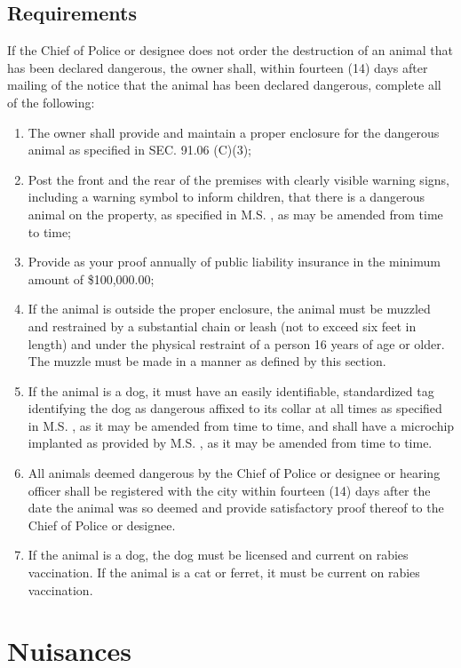 \subsection{Requirements}
If the Chief of Police or designee does not order the destruction of an animal that has been declared dangerous, the owner shall, within fourteen (14) days after mailing of the notice that the animal has been declared dangerous, complete all of the following:
\begin{enumerate}[{\indent}1)]
    \item The owner shall provide and maintain a proper enclosure for the dangerous animal as specified in SEC. 91.06 (C)(3);
    \item Post the front and the rear of the premises with clearly visible warning signs, including a warning symbol to inform children, that there is a dangerous animal on the property, as specified in M.S. , as may be amended from time to time;
    \item Provide as your proof annually of public liability insurance in the minimum amount of \$100,000.00;
    \item If the animal is outside the proper enclosure, the animal must be muzzled and restrained by a substantial chain or leash (not to exceed six feet in length) and under the physical restraint of a person 16 years of age or older.  The muzzle must be made in a manner as defined by this section.
    \item If the animal is a dog, it must have an easily identifiable, standardized tag identifying the dog as dangerous affixed to its collar at all times as specified in M.S. , as it may be amended from time to time, and shall have a microchip implanted as provided by M.S. , as it may be amended from time to time.
    \item All animals deemed dangerous by the Chief of Police or designee or hearing officer shall be registered with the city within fourteen (14) days after the date the animal was so deemed and provide satisfactory proof thereof to the Chief of Police or designee.
    \item If the animal is a dog, the dog must be licensed and current on rabies vaccination.  If the animal is a cat or ferret, it must be current on rabies vaccination.
\end{enumerate}
\section{Nuisances}
